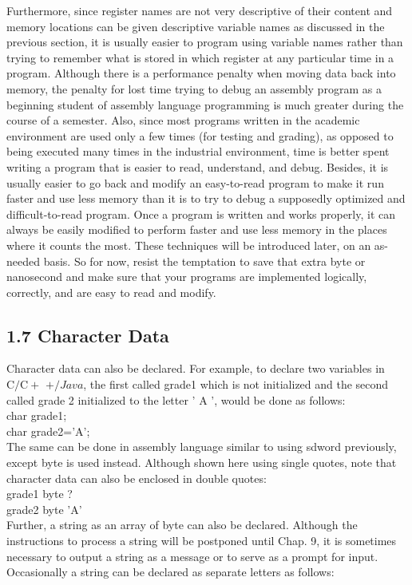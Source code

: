 \documentclass[10pt]{book}
\begin{document}
Furthermore, since register names are not very descriptive of their content and memory locations can be given descriptive variable names as discussed in the previous section, it is usually easier to program using variable names rather than trying to remember what is stored in which register at any particular time in a program. Although there is a performance penalty when moving data back into memory, the penalty for lost time trying to debug an assembly program as a beginning student of assembly language programming is much greater during the course of a semester. Also, since most programs written in the academic environment are used only a few times (for testing and grading), as opposed to being executed many times in the industrial environment, time is better spent writing a program that is easier to read, understand, and debug. Besides, it is usually easier to go back and modify an easy-to-read program to make it run faster and use less memory than it is to try to debug a supposedly optimized and difficult-to-read program. Once a program is written and works properly, it can always be easily modified to perform faster and use less memory in the places where it counts the most. These techniques will be introduced later, on an as-needed basis. So for now, resist the temptation to save that extra byte or nanosecond and make sure that your programs are implemented logically, correctly, and are easy to read and modify.

\subsection*{1.7 Character Data}
Character data can also be declared. For example, to declare two variables in $\mathrm{C} / \mathrm{C}+$ $+/ J a v a$, the first called grade1 which is not initialized and the second called grade 2 initialized to the letter ' A ', would be done as follows:\\
char grade1;\\
char grade2='A';\\
The same can be done in assembly language similar to using sdword previously, except byte is used instead. Although shown here using single quotes, note that character data can also be enclosed in double quotes:\\
grade1 byte ?\\
grade2 byte 'A'\\

Further, a string as an array of byte can also be declared. Although the instructions to process a string will be postponed until Chap. 9, it is sometimes necessary to output a string as a message or to serve as a prompt for input. Occasionally a string can be declared as separate letters as follows:
\end{document}
